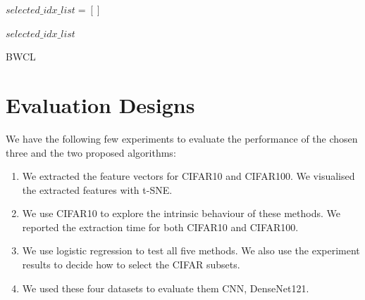 
\begin{algorithm}[H]

$selected\_idx\_list = []$ \;



\Return $selected\_idx\_list$ \;

\caption{BWCL}
\end{algorithm}


\section{Evaluation Designs}
We have the following few experiments to evaluate the performance of the chosen three and the two proposed algorithms:

\begin{enumerate}
\item We extracted the feature vectors for CIFAR10 and CIFAR100. We visualised the extracted features with t-SNE.
\item We use CIFAR10 to explore the intrinsic behaviour of these methods. We reported the extraction time for both CIFAR10 and CIFAR100.
\item We use logistic regression to test all five methods. We also use the experiment results to decide how to select the CIFAR subsets.
\item We used these four datasets to evaluate them CNN, DenseNet121.
\end{enumerate}

